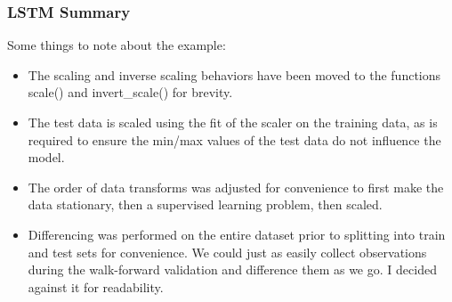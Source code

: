 \begin{frame}[fragile] \frametitle{LSTM Summary}
Some things to note about the example:
\begin{itemize}
\item The scaling and inverse scaling behaviors have been moved to the functions scale() and invert\_scale() for brevity.
\item     The test data is scaled using the fit of the scaler on the training data, as is required to ensure the min/max values of the test data do not influence the model.
\item     The order of data transforms was adjusted for convenience to first make the data stationary, then a supervised learning problem, then scaled.
\item     Differencing was performed on the entire dataset prior to splitting into train and test sets for convenience. We could just as easily collect observations during the walk-forward validation and difference them as we go. I decided against it for readability.

\end{itemize}
\end{frame}

